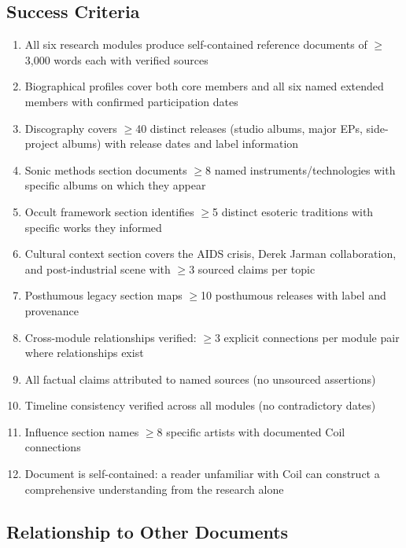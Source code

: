 \documentclass[11pt,letterpaper]{article}
\begin{document}
\subsection{Success Criteria}

\begin{enumerate}[label=\arabic*., leftmargin=2em]
\item All six research modules produce self-contained reference documents of $\geq$3,000 words each with verified sources
\item Biographical profiles cover both core members and all six named extended members with confirmed participation dates
\item Discography covers $\geq$40 distinct releases (studio albums, major EPs, side-project albums) with release dates and label information
\item Sonic methods section documents $\geq$8 named instruments/technologies with specific albums on which they appear
\item Occult framework section identifies $\geq$5 distinct esoteric traditions with specific works they informed
\item Cultural context section covers the AIDS crisis, Derek Jarman collaboration, and post-industrial scene with $\geq$3 sourced claims per topic
\item Posthumous legacy section maps $\geq$10 posthumous releases with label and provenance
\item Cross-module relationships verified: $\geq$3 explicit connections per module pair where relationships exist
\item All factual claims attributed to named sources (no unsourced assertions)
\item Timeline consistency verified across all modules (no contradictory dates)
\item Influence section names $\geq$8 specific artists with documented Coil connections
\item Document is self-contained: a reader unfamiliar with Coil can construct a comprehensive understanding from the research alone
\end{enumerate}

\subsection{Relationship to Other Documents}
\end{document}
